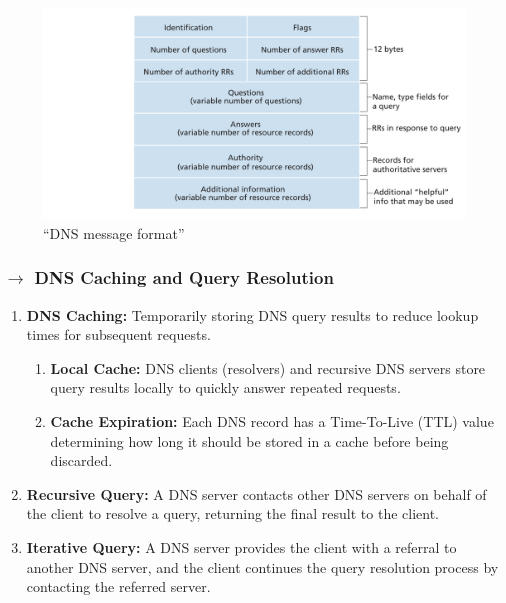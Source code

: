 \begin{figure}[H]
    \centering
    \includegraphics[width = 0.8\linewidth]{img/2/dns-message-format.png}
    \caption{``DNS message format''\protect\cite{Kurose2017}}
    \label{fig:dns-message-format}
\end{figure}

\renewcommand*{\thefootnote}{\fnsymbol{footnote}}
\renewcommand*{\thefootnote}{\arabic{footnote}}

\subsubsection[2.4.4 DNS Caching and Query Resolution]{$\pmb{\rightarrow}$ DNS Caching and Query Resolution}


\begin{enumerate}
    \item \textbf{DNS Caching:} Temporarily storing DNS query results to reduce lookup times for subsequent requests.
    \begin{enumerate}
            \item \textbf{Local Cache:} DNS clients (resolvers) and recursive DNS servers store query results locally to quickly answer repeated requests.
            \item \textbf{Cache Expiration:} Each DNS record has a Time-To-Live (TTL) value determining how long it should be stored in a cache before being discarded.
    \end{enumerate}
    
    \item \textbf{Recursive Query:} A DNS server contacts other DNS servers on behalf of the client to resolve a query, returning the final result to the client.
    
    \item \textbf{Iterative Query:} A DNS server provides the client with a referral to another DNS server, and the client continues the query resolution process by contacting the referred server.
\end{enumerate}

